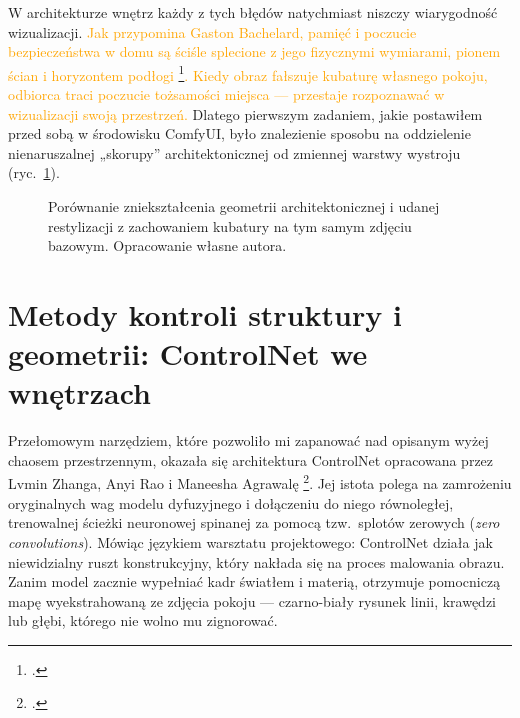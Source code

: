 W architekturze wnętrz każdy z tych błędów natychmiast niszczy wiarygodność wizualizacji. \textcolor{orange}{Jak przypomina Gaston Bachelard, pamięć i poczucie bezpieczeństwa w domu są ściśle splecione z jego fizycznymi wymiarami, pionem ścian i horyzontem podłogi \footcite{bachelard1975wyobraznia}. Kiedy obraz fałszuje kubaturę własnego pokoju, odbiorca traci poczucie tożsamości miejsca --- przestaje rozpoznawać w wizualizacji swoją przestrzeń.} Dlatego pierwszym zadaniem, jakie postawiłem przed sobą w środowisku ComfyUI, było znalezienie sposobu na oddzielenie nienaruszalnej „skorupy” architektonicznej od zmiennej warstwy wystroju (ryc.~\ref{fig:ch04:geometry}).

\begin{figure}[htbp]
  \centering
  \caption{Porównanie zniekształcenia geometrii architektonicznej i udanej restylizacji z zachowaniem kubatury na tym samym zdjęciu bazowym.
  Opracowanie własne autora.}
  \label{fig:ch04:geometry}
\end{figure}

\section{Metody kontroli struktury i geometrii: ControlNet we wnętrzach}
\label{ch04:sec:controlnet}

Przełomowym narzędziem, które pozwoliło mi zapanować nad opisanym wyżej chaosem przestrzennym, okazała się architektura ControlNet opracowana przez Lvmin Zhanga, Anyi Rao i Maneesha Agrawalę \footcite{zhang2023controlnet}. Jej istota polega na zamrożeniu oryginalnych wag modelu dyfuzyjnego i dołączeniu do niego równoległej, trenowalnej ścieżki neuronowej spinanej za pomocą tzw.\ splotów zerowych (\emph{zero convolutions}). Mówiąc językiem warsztatu projektowego: ControlNet działa jak niewidzialny ruszt konstrukcyjny, który nakłada się na proces malowania obrazu. Zanim model zacznie wypełniać kadr światłem i materią, otrzymuje pomocniczą mapę wyekstrahowaną ze zdjęcia pokoju --- czarno-biały rysunek linii, krawędzi lub głębi, którego nie wolno mu zignorować.

